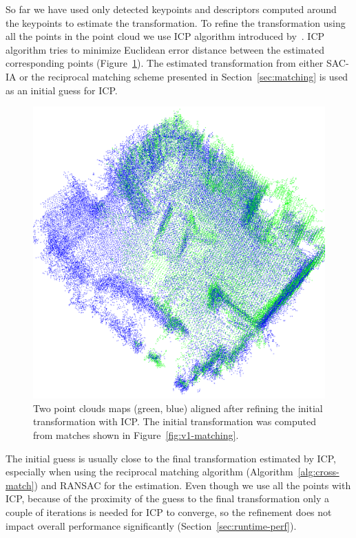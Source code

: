 So far we have used only detected keypoints and descriptors computed around the keypoints to estimate the transformation. To refine the transformation using all the points in the point cloud we use \gls{ICP} algorithm introduced by~\citet{besl1992icp}. \gls{ICP} algorithm tries to minimize Euclidean error distance between the estimated corresponding points (Figure~\ref{fig:v1-refined}). The estimated transformation from either \gls{SAC-IA} or the reciprocal matching scheme presented in Section~\ref{sec:matching} is used as an initial guess for \gls{ICP}.

\begin{figure}
    \centering
    \includegraphics[width=\textwidth]{../img/v1-refined.png}
    \caption[Aligned point clouds]{Two point clouds maps (green, blue) aligned after refining the initial transformation with \gls{ICP}. The initial transformation was computed from matches shown in Figure~\ref{fig:v1-matching}.}
    \label{fig:v1-refined}
\end{figure}

The initial guess is usually close to the final transformation estimated by \gls{ICP}, especially when using the reciprocal matching algorithm (Algorithm~\ref{alg:cross-match}) and \gls{RANSAC} for the estimation. Even though we use all the points with \gls{ICP}, because of the proximity of the guess to the final transformation only a couple of iterations is needed for \gls{ICP} to converge, so the refinement does not impact overall performance significantly (Section~\ref{sec:runtime-perf}).

